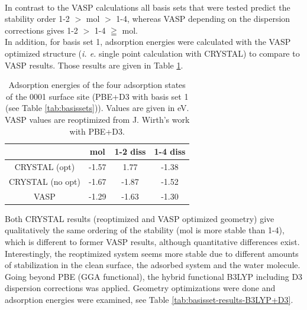\documentclass[11pt,DIV=13,BCOR=5mm,a4paper,headinclude]{scrbook}
\begin{document}
 \\
 In contrast to the VASP calculations all basis sets that were tested predict the stability order 1-2 $>$ mol $>$ 1-4, whereas VASP depending on the dispersion corrections gives 1-2 $>$ 1-4 $\geqq$ mol.
 \\
 In addition, for basis set 1, adsorption energies were calculated with the VASP optimized structure (\textit{i.
e.} single point calculation with CRYSTAL) to compare to VASP results.
Those results are given in Table \ref{tab:pbe-vasp-geom}.
\begin{table}[!h]
  \centering
   \caption{Adsorption energies of the four adsorption states of the 0001 surface site (PBE+D3 with basis set 1 (see Table \ref{tab:basissets})).
Values are given in eV.
VASP values are reoptimized from J. Wirth's work with PBE+D3.}
  \begin{tabular}{cccc}%
  \toprule
   &mol & 1-2 diss & 1-4 diss\\\midrule %
CRYSTAL (opt) & -1.57 & 1.77 &-1.38 \\%
   CRYSTAL (no opt)&-1.67 &-1.87 &-1.52\\%
  VASP &-1.29 &-1.63 &-1.30 \\%
  \bottomrule
  \end{tabular}
  \label{tab:pbe-vasp-geom}
\end{table}
Both CRYSTAL results (reoptimized and VASP optimized geometry) give qualitatively the same ordering of the stability (mol is more stable than 1-4), which is different to former VASP results, although quantitative differences exist.
Interestingly, the reoptimized system seems more stable due to different amounts of stabilization in the clean surface, the adsorbed system and the water molecule.
 \\
 Going beyond PBE (GGA functional), the hybrid functional B3LYP including D3 dispersion corrections was applied.
Geometry optimizations were done and adsorption energies were examined, see Table \ref{tab:basisset-results-B3LYP+D3}.
\end{document}
